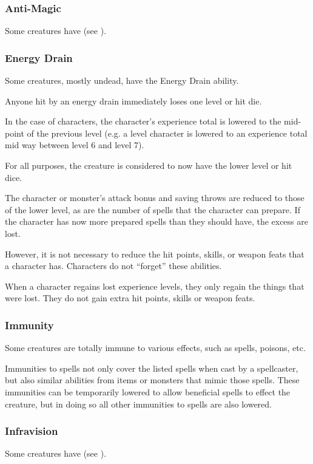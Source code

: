 \begin{multicols*}{2}
\subsubsection{Anti-Magic}
Some creatures have  (see ).

\subsubsection{Energy Drain}\label{sec:Energy Drain}
Some creatures, mostly undead, have the Energy Drain ability.

Anyone hit by an energy drain immediately loses one level or hit die.

In the case of characters, the character’s experience total is lowered to the mid-point of the previous level (e.g. a  level character is lowered to an experience total mid way between level 6 and level 7).

For all purposes, the creature is considered to now have the lower level or hit dice.

The character or monster’s attack bonus and saving throws are reduced to those of the lower level, as are the number of spells that the character can prepare. If the character has now more prepared spells than they should have, the excess are lost.

However, it is not necessary to reduce the hit points, skills, or weapon feats that a character has. Characters do not “forget” these abilities.

When a character regains lost experience levels, they only regain the things that were lost. They do not gain extra hit points, skills or weapon feats.

\subsubsection{Immunity}
Some creatures are totally immune to various effects, such as spells, poisons, etc.

Immunities to spells not only cover the listed spells when cast by a spellcaster, but also similar abilities from items or monsters that mimic those spells. These immunities can be temporarily lowered to allow beneficial spells to effect the creature, but in doing so all other immunities to spells are also lowered.

\subsubsection{Infravision}
Some creatures have  (see ).


\end{multicols*}
